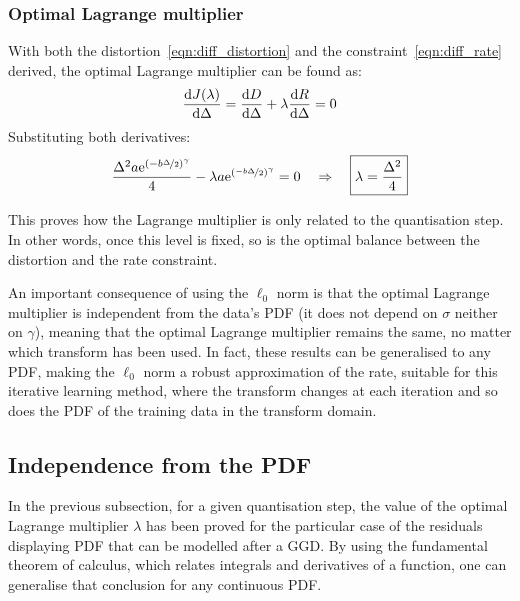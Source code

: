 \documentclass[11pt,a4paper,openright,twoside]{book}
\numberwithin{equation}{section} %
\numberwithin{figure}{section} %
\numberwithin{table}{section} %
\begin{document}
\subsubsection{Optimal Lagrange multiplier}
\label{ssub:optimal_lagrange_multiplier}

With both the distortion~\eqref{eqn:diff_distortion} and the
constraint~\eqref{eqn:diff_rate} derived, the optimal Lagrange
multiplier can be found as:
\begin{equation}
	\frac{\text{d} J(\lambda)}{\text{d} \Delta}
	= \frac{\text{d} D}{\text{d} \Delta} +
	\lambda \frac{\text{d} R}{\text{d} \Delta} = 0 \\
	\label{eqn:diff_lagrange_multiplier}
\end{equation}
Substituting both derivatives:
\begin{equation}
	\frac{\Delta^2 a \text{e}^{{(-b\nicefrac{\Delta}{2})}^\gamma}}{4}
	- \lambda
	a\text{e}^{{\left(\nicefrac{-b\Delta}{2}\right)}^\gamma} = 0
	\quad \Rightarrow \quad \boxed{\lambda = \frac{\Delta^2}{4}}
\end{equation}

This proves how the Lagrange multiplier is only related to the quantisation
step.
In other words, once this level is fixed, so is the optimal balance between
the distortion and the rate constraint.

An important consequence of using the $\ell_0$ norm is that the optimal
Lagrange multiplier is independent from the data's \ac{PDF} (it does
not depend on $\sigma$ neither on $\gamma$), meaning that the optimal
Lagrange multiplier remains the same, no matter which transform has been
used.
In fact, these results can be generalised to any \ac{PDF}, making the
$\ell_0$ norm a robust approximation of the rate, suitable for this
iterative learning method, where the transform changes at each iteration
and so does the \ac{PDF} of the training data in the transform domain.

\subsection{Independence from the \ac{PDF}}
\label{sub:independence_from_the_pdf}

In the previous subsection, for a given quantisation step, the value of
the optimal Lagrange multiplier $\lambda$ has been proved for the
particular case of the residuals displaying \ac{PDF} that can be
modelled after a \ac{GGD}.
By using the fundamental theorem of calculus, which relates integrals
and derivatives of a function, one can generalise that conclusion for
any continuous \ac{PDF}.
\end{document}
